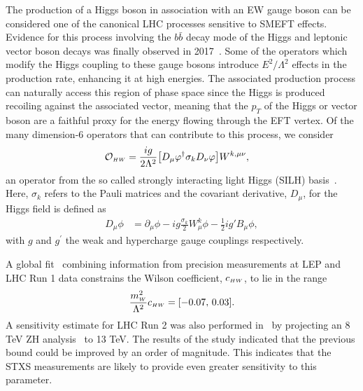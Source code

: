 The production of a Higgs boson in association with an EW gauge boson can be considered one of the canonical LHC processes sensitive to SMEFT effects. Evidence for this process involving the $b\bar{b}$ decay mode of the Higgs and leptonic vector boson decays was finally observed in 2017~\cite{Aaboud:2017xsd,Sirunyan:2017elk}. Some of the operators which modify the Higgs coupling to these gauge bosons introduce $E^2/\Lambda^2$ effects in the production rate, enhancing it at high energies.
The associated production process can naturally access this region of phase space since the Higgs is produced recoiling against the associated vector, meaning that the $p_T$ of the Higgs or vector boson are a faithful proxy for the energy flowing through the EFT vertex. Of the many dimension-6 operators that can contribute to this process, we consider 
\begin{align}
    \mathcal{O}_{\scriptscriptstyle HW} &= 
    \frac{ig}{2\Lambda^2} \big[D_\mu \varphi^\dag \sigma_{k} D_\nu \varphi\big] 
    W^{k,\mu \nu},
\end{align}
an operator from the so called strongly interacting light Higgs (SILH) basis~\cite{Giudice:2007fh,Contino:2013kra}. Here, $\sigma_{k}$ refers to the Pauli matrices and the covariant derivative, $D_\mu$, for the Higgs field is defined as
\begin{align}
    D_\mu\phi &= \partial_\mu \phi -  i g \frac{\sigma_{k}}{2} W_\mu^k \phi - \frac12 i g' B_\mu \phi,
\end{align}
with $g$ and $g^\prime$ the weak and hypercharge gauge couplings respectively.

A global fit~\cite{Ellis:2014jta} combining information from precision measurements at LEP and LHC Run 1 data constrains the Wilson coefficient, $c_{\scriptscriptstyle HW}$, to lie in the range 
\begin{align}
    \frac{m_{\scriptscriptstyle W}^2}{\Lambda^2}c_{\scriptscriptstyle HW} = [-0.07,\,0.03].
\end{align}
A sensitivity estimate for LHC Run 2 was also performed in~\cite{Degrande:2016dqg} by projecting an 8 TeV ZH analysis~\cite{TheATLAScollaboration:2013lia} to 13 TeV. The results of the study indicated that the previous bound could be improved by an order of magnitude. This indicates that the STXS measurements are likely to provide even greater sensitivity to this parameter.

